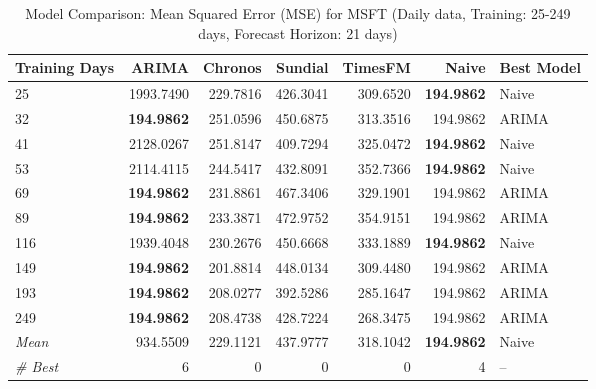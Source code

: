 \begin{table}[htbp]
\centering
\caption{Model Comparison: Mean Squared Error (MSE) for MSFT (Daily data, Training: 25-249 days, Forecast Horizon: 21 days)}
\label{tab:comparison_MSFT_1d_train-less-year-log_h21_MSE}
\small
\begin{tabular}{lrrrrrl}
\toprule
Training Days & ARIMA & Chronos & Sundial & TimesFM & Naive & Best Model \\
\midrule
25 & 1993.7490 & 229.7816 & 426.3041 & 309.6520 & \textbf{194.9862} & Naive \\
32 & \textbf{194.9862} & 251.0596 & 450.6875 & 313.3516 & 194.9862 & ARIMA \\
41 & 2128.0267 & 251.8147 & 409.7294 & 325.0472 & \textbf{194.9862} & Naive \\
53 & 2114.4115 & 244.5417 & 432.8091 & 352.7366 & \textbf{194.9862} & Naive \\
69 & \textbf{194.9862} & 231.8861 & 467.3406 & 329.1901 & 194.9862 & ARIMA \\
89 & \textbf{194.9862} & 233.3871 & 472.9752 & 354.9151 & 194.9862 & ARIMA \\
116 & 1939.4048 & 230.2676 & 450.6668 & 333.1889 & \textbf{194.9862} & Naive \\
149 & \textbf{194.9862} & 201.8814 & 448.0134 & 309.4480 & 194.9862 & ARIMA \\
193 & \textbf{194.9862} & 208.0277 & 392.5286 & 285.1647 & 194.9862 & ARIMA \\
249 & \textbf{194.9862} & 208.4738 & 428.7224 & 268.3475 & 194.9862 & ARIMA \\
\midrule
\textit{Mean} & 934.5509 & 229.1121 & 437.9777 & 318.1042 & \textbf{194.9862} & Naive \\
\textit{\# Best} & 6 & 0 & 0 & 0 & 4 & -- \\
\bottomrule
\end{tabular}
\end{table}